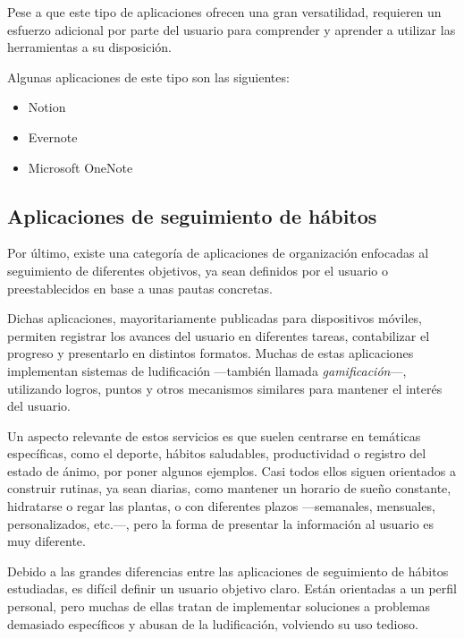 \documentclass[10pt, a4paper]{aqademic}
\begin{document}
\medskip

Pese a que este tipo de aplicaciones ofrecen una gran versatilidad, requieren un esfuerzo adicional por parte del usuario para comprender y aprender a utilizar las herramientas a su disposición. 

\medskip

Algunas aplicaciones de este tipo son las siguientes:

\begin{itemize}
	\item Notion
	\item Evernote
	\item Microsoft OneNote
\end{itemize}

\subsection*{Aplicaciones de seguimiento de hábitos}

Por último, existe una categoría de aplicaciones de organización enfocadas al seguimiento de diferentes objetivos, ya sean definidos por el usuario o preestablecidos en base a unas pautas concretas. 

\medskip

Dichas aplicaciones, mayoritariamente publicadas para dispositivos móviles, permiten registrar los avances del usuario en diferentes tareas, contabilizar el progreso y presentarlo en distintos formatos. Muchas de estas aplicaciones implementan sistemas de ludificación \cite{inproceedings} ---también llamada \textit{gamificación}---, utilizando logros, puntos y otros mecanismos similares para mantener el interés del usuario.

\medskip

Un aspecto relevante de estos servicios es que suelen centrarse en temáticas específicas, como el deporte, hábitos saludables, productividad o registro del estado de ánimo, por poner algunos ejemplos. Casi todos ellos siguen orientados a construir rutinas, ya sean diarias, como mantener un horario de sueño constante, hidratarse o regar las plantas, o con diferentes plazos ---semanales, mensuales, personalizados, etc.---, pero la forma de presentar la información al usuario es muy diferente. 

\medskip

Debido a las grandes diferencias entre las aplicaciones de seguimiento de hábitos estudiadas, es difícil definir un usuario objetivo claro. Están orientadas a un perfil personal, pero muchas de ellas tratan de implementar soluciones a problemas demasiado específicos y abusan de la ludificación, volviendo su uso tedioso.
\end{document}
